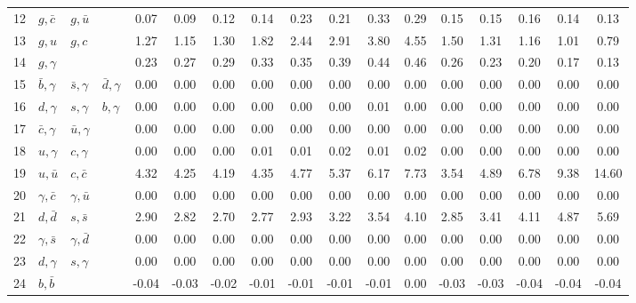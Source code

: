 \begin{tabularx}{\textwidth}{rXXX@{}S@{}S@{}S@{}S@{}S@{}S@{}S@{}S@{}S@{}S@{}S@{}S@{}S}
  12 & $g,\bar c$      & $g,\bar u$      &                 &  0.07 &  0.09 &  0.12 &  0.14 &  0.23 &  0.21 &  0.33 &  0.29 &  0.15 &  0.15 &  0.16 &  0.14 &  0.13 \\
  13 & $g, u$          & $g, c$          &                 &  1.27 &  1.15 &  1.30 &  1.82 &  2.44 &  2.91 &  3.80 &  4.55 &  1.50 &  1.31 &  1.16 &  1.01 &  0.79 \\
  14 & $g,\gamma$      &                 &                 &  0.23 &  0.27 &  0.29 &  0.33 &  0.35 &  0.39 &  0.44 &  0.46 &  0.26 &  0.23 &  0.20 &  0.17 &  0.13 \\
  15 & $\bar b,\gamma$ & $\bar s,\gamma$ & $\bar d,\gamma$ &  0.00 &  0.00 &  0.00 &  0.00 &  0.00 &  0.00 &  0.00 &  0.00 &  0.00 &  0.00 &  0.00 &  0.00 &  0.00 \\
  16 & $d,\gamma$      & $s,\gamma$      & $b,\gamma$      &  0.00 &  0.00 &  0.00 &  0.00 &  0.00 &  0.00 &  0.01 &  0.00 &  0.00 &  0.00 &  0.00 &  0.00 &  0.00 \\
  17 & $\bar c,\gamma$ & $\bar u,\gamma$ &                 &  0.00 &  0.00 &  0.00 &  0.00 &  0.00 &  0.00 &  0.00 &  0.00 &  0.00 &  0.00 &  0.00 &  0.00 &  0.00 \\
  18 & $u,\gamma$      & $c,\gamma$      &                 &  0.00 &  0.00 &  0.00 &  0.01 &  0.01 &  0.02 &  0.01 &  0.02 &  0.00 &  0.00 &  0.00 &  0.00 &  0.00 \\
  19 & $u,\bar u$      & $c,\bar c$      &                 &  4.32 &  4.25 &  4.19 &  4.35 &  4.77 &  5.37 &  6.17 &  7.73 &  3.54 &  4.89 &  6.78 &  9.38 & 14.60 \\
  20 & $\gamma,\bar c$ & $\gamma,\bar u$ &                 &  0.00 &  0.00 &  0.00 &  0.00 &  0.00 &  0.00 &  0.00 &  0.00 &  0.00 &  0.00 &  0.00 &  0.00 &  0.00 \\
  21 & $d,\bar d$     & $s,\bar s$      &                  &  2.90 &  2.82 &  2.70 &  2.77 &  2.93 &  3.22 &  3.54 &  4.10 &  2.85 &  3.41 &  4.11 &  4.87 &  5.69 \\
  22 & $\gamma,\bar s$ & $\gamma,\bar d$ &                 &  0.00 &  0.00 &  0.00 &  0.00 &  0.00 &  0.00 &  0.00 &  0.00 &  0.00 &  0.00 &  0.00 &  0.00 &  0.00 \\
  23 & $d,\gamma$      & $s,\gamma$      &                 &  0.00 &  0.00 &  0.00 &  0.00 &  0.00 &  0.00 &  0.00 &  0.00 &  0.00 &  0.00 &  0.00 &  0.00 &  0.00 \\
  24 & $b,\bar b$      &                 &                 & -0.04 & -0.03 & -0.02 & -0.01 & -0.01 & -0.01 & -0.01 &  0.00 & -0.03 & -0.03 & -0.04 & -0.04 & -0.04 \\

\end{tabularx}
